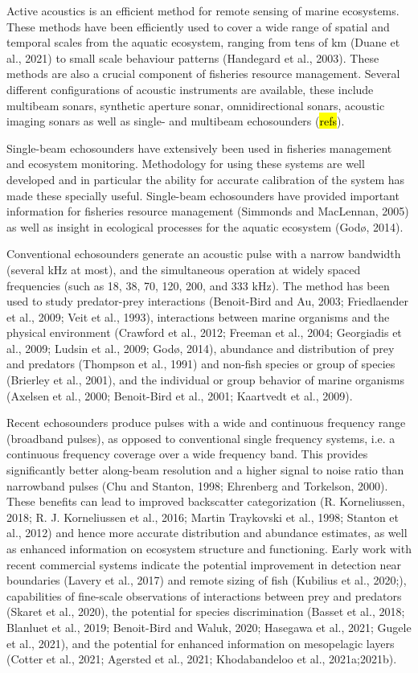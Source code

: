 \documentclass[preprint,12pt,TurnOnLineNumbers]{JASAnew}
\begin{document}
Active acoustics is an efficient method for remote sensing of marine ecosystems. These methods have been efficiently used to cover a wide range of spatial and temporal scales from the aquatic ecosystem, ranging from tens of km (Duane et al., 2021) to small scale behaviour patterns (Handegard et al., 2003). These methods are also a crucial component of fisheries resource management. Several different configurations of acoustic instruments are available, these include multibeam sonars, synthetic aperture sonar, omnidirectional sonars, acoustic imaging sonars as well as single- and multibeam echosounders (\hl{refs}).

Single-beam echosounders have extensively been used in fisheries management and ecosystem monitoring. Methodology for using these systems are well developed and in particular the ability for accurate calibration of the system has made these specially useful. Single-beam echosounders have provided important information for fisheries resource management (Simmonds and MacLennan, 2005) as well as insight in ecological processes for the aquatic ecosystem (Godø, 2014). 

Conventional echosounders generate an acoustic pulse with a narrow bandwidth (several kHz at most), and the simultaneous operation at widely spaced frequencies (such as 18, 38, 70, 120, 200, and 333 kHz). The method has been used to  study predator-prey interactions (Benoit-Bird and Au, 2003; Friedlaender et al., 2009; Veit et al., 1993), interactions between marine organisms and the physical environment (Crawford et al., 2012; Freeman et al., 2004; Georgiadis et al., 2009; Ludsin et al., 2009; Godø, 2014), abundance and distribution of prey and predators (Thompson et al., 1991) and non-fish species or group of species (Brierley et al., 2001), and the individual or group behavior of marine organisms (Axelsen et al., 2000; Benoit-Bird et al., 2001; Kaartvedt et al., 2009).

Recent echosounders produce pulses with a wide and continuous frequency range (broadband pulses), as opposed to conventional single frequency systems, i.e. a continuous frequency coverage over a wide frequency band. This provides significantly better along-beam resolution and a higher signal to noise ratio than narrowband pulses (Chu and Stanton, 1998; Ehrenberg and Torkelson, 2000). These benefits can lead to improved backscatter categorization (R. Korneliussen, 2018; R. J. Korneliussen et al., 2016; Martin Traykovski et al., 1998; Stanton et al., 2012) and hence more accurate distribution and abundance estimates, as well as enhanced information on ecosystem structure and functioning. Early work with recent commercial systems indicate the potential improvement in detection near boundaries (Lavery et al., 2017) and remote sizing of fish (Kubilius et al., 2020;), capabilities of fine-scale observations of interactions between prey and predators (Skaret et al., 2020), the potential for species discrimination (Basset et al., 2018; Blanluet et al., 2019; Benoit-Bird and Waluk, 2020; Hasegawa et al., 2021; Gugele et al., 2021), and the potential for enhanced information on mesopelagic layers (Cotter et al., 2021; Agersted et al., 2021; Khodabandeloo et al., 2021a;2021b).
\end{document}
